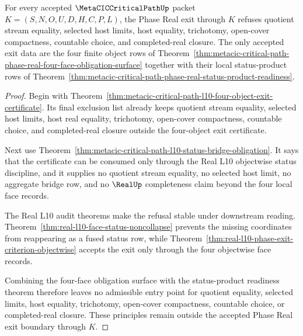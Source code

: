 \begin{theorem}
\label{thm:metacic-critical-path-phase-real-exit-refusal-boundary}
For every accepted $\MetaCICCriticalPathUp$ packet $K=(S,N,O,U,D,H,C,P,L)$, the Phase Real exit through $K$ refuses quotient stream equality, selected host limits, host equality, trichotomy, open-cover compactness, countable choice, and completed-real closure. The only accepted exit data are the four finite object rows of Theorem~\ref{thm:metacic-critical-path-phase-real-four-face-obligation-surface} together with their local status-product rows of Theorem~\ref{thm:metacic-critical-path-phase-real-status-product-readiness}.
\end{theorem}
\begin{proof}
Begin with Theorem~\ref{thm:metacic-critical-path-l10-four-object-exit-certificate}. Its final exclusion list already keeps quotient stream equality, selected host limits, host real equality, trichotomy, open-cover compactness, countable choice, and completed-real closure outside the four-object exit certificate.

Next use Theorem~\ref{thm:metacic-critical-path-l10-status-bridge-obligation}. It says that the certificate can be consumed only through the Real L10 objectwise status discipline, and it supplies no quotient stream equality, no selected host limit, no aggregate bridge row, and no $\RealUp$ completeness claim beyond the four local face records.

The Real L10 audit theorems make the refusal stable under downstream reading. Theorem~\ref{thm:real-l10-face-status-noncollapse} prevents the missing coordinates from reappearing as a fused status row, while Theorem~\ref{thm:real-l10-phase-exit-criterion-objectwise} accepts the exit only through the four objectwise face records.

Combining the four-face obligation surface with the status-product readiness theorem therefore leaves no admissible entry point for quotient equality, selected limits, host equality, trichotomy, open-cover compactness, countable choice, or completed-real closure. These principles remain outside the accepted Phase Real exit boundary through $K$.
\end{proof}

